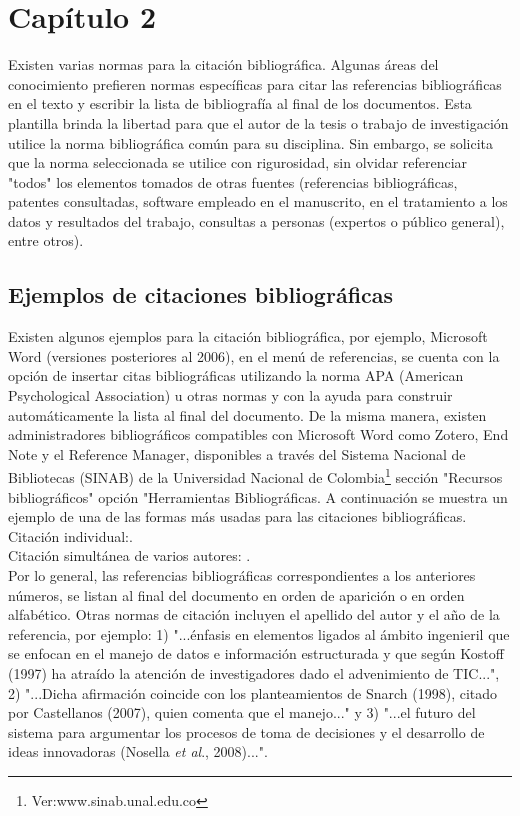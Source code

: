 \chapter{Capítulo 2}
Existen varias normas para la citación bibliográfica. Algunas áreas del conocimiento prefieren normas específicas para citar las referencias bibliográficas en el texto y escribir la lista de bibliografía al final de los documentos. Esta plantilla brinda la libertad para que el autor de la tesis  o trabajo de investigación utilice la norma bibliográfica común para su disciplina. Sin embargo, se solicita que la norma seleccionada se utilice con rigurosidad, sin olvidar referenciar "todos" los elementos tomados de otras fuentes (referencias bibliográficas, patentes consultadas, software empleado en el manuscrito, en el tratamiento a los datos y resultados del trabajo, consultas a personas (expertos o público general), entre otros).\\

\section{Ejemplos de citaciones bibliográficas}
Existen algunos ejemplos para la citación bibliográfica, por ejemplo, Microsoft Word (versiones posteriores al 2006), en el  menú de referencias, se cuenta con la opción de insertar citas bibliográficas utilizando la norma APA (American Psychological Association) u otras normas y con la ayuda para construir automáticamente la lista al final del documento. De la misma manera, existen administradores bibliográficos compatibles con Microsoft Word como Zotero, End Note y el Reference Manager,  disponibles a través del Sistema Nacional de Bibliotecas (SINAB) de la Universidad Nacional de Colombia\footnote{Ver:www.sinab.unal.edu.co } sección "Recursos bibliográficos" opción "Herramientas Bibliográficas. A continuación se muestra un ejemplo de una de las formas más usadas para las citaciones bibliográficas.\\

Citación individual:\cite{AG01}.\\
Citación simultánea de varios autores:
\cite{AG12,AG52,AG70,AG08a,AG09a,AG36a,AG01i}.\\

Por lo general, las referencias bibliográficas correspondientes a los anteriores números, se listan al final del documento en orden de aparición o en orden alfabético. Otras normas de citación incluyen el apellido del autor y el año de la referencia, por ejemplo: 1) "...énfasis en elementos ligados al ámbito ingenieril que se enfocan en el manejo de datos e información estructurada y que según Kostoff (1997) ha atraído la atención de investigadores dado el advenimiento de TIC...", 2) "...Dicha afirmación coincide con los planteamientos de Snarch (1998), citado por Castellanos (2007), quien comenta que el manejo..." y 3) "...el futuro del sistema para argumentar los procesos de toma de decisiones y el desarrollo de ideas innovadoras (Nosella \textsl{et al}., 2008)...".\\

